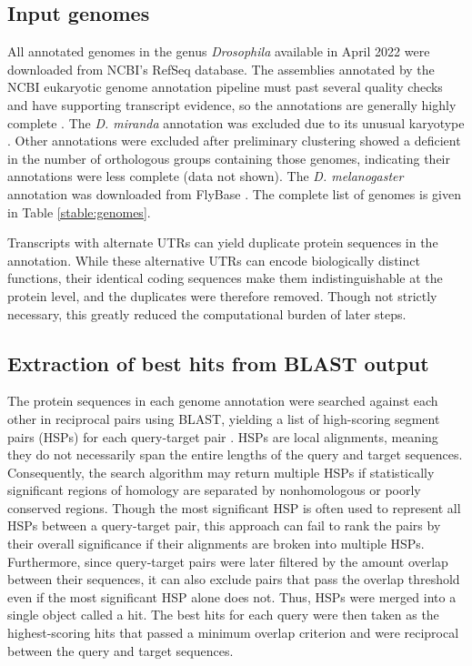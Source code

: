 \documentclass[10pt,letterpaper]{article}
\begin{document}
\subsection*{Input genomes}
All annotated genomes in the genus \textit{Drosophila} available in April 2022 were downloaded from NCBI's RefSeq database. The assemblies annotated by the NCBI eukaryotic genome annotation pipeline must past several quality checks and have supporting transcript evidence, so the annotations are generally highly complete \cite{Thibaud-Nissen2013}. The \textit{D. miranda} annotation was excluded due to its unusual karyotype \cite{Dobzhansky1935}. Other annotations were excluded after preliminary clustering showed a deficient in the number of orthologous groups containing those genomes, indicating their annotations were less complete (data not shown). The \textit{D. melanogaster} annotation was downloaded from FlyBase \cite{Gramates2022}. The complete list of genomes is given in Table \ref{stable:genomes}.

Transcripts with alternate UTRs can yield duplicate protein sequences in the annotation. While these alternative UTRs can encode biologically distinct functions, their identical coding sequences make them indistinguishable at the protein level, and the duplicates were therefore removed. Though not strictly necessary, this greatly reduced the computational burden of later steps.

\subsection*{Extraction of best hits from BLAST output}
The protein sequences in each genome annotation were searched against each other in reciprocal pairs using BLAST, yielding a list of high-scoring segment pairs (HSPs) for each query-target pair \cite{Camacho2009}. HSPs are local alignments, meaning they do not necessarily span the entire lengths of the query and target sequences. Consequently, the search algorithm may return multiple HSPs if statistically significant regions of homology are separated by nonhomologous or poorly conserved regions. Though the most significant HSP is often used to represent all HSPs between a query-target pair, this approach can fail to rank the pairs by their overall significance if their alignments are broken into multiple HSPs. Furthermore, since query-target pairs were later filtered by the amount overlap between their sequences, it can also exclude pairs that pass the overlap threshold even if the most significant HSP alone does not. Thus, HSPs were merged into a single object called a hit. The best hits for each query were then taken as the highest-scoring hits that passed a minimum overlap criterion and were reciprocal between the query and target sequences.
\end{document}
